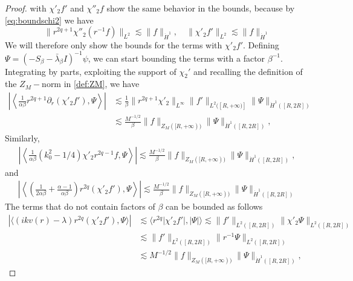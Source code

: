 \documentclass[11pt,reqno]{amsproc}
\def\de{{\partial}}
\def\HH {\dot{H}^1}
\theoremstyle{definition}
\theoremstyle{definition}
\numberwithin{equation}{section}
\begin{document}
\begin{proof}
with $\chi'_2 f'$ and $\chi''_2 f$ show the same behavior in the bounds, because by \cref{eq:boundschi2} we have
\begin{equation}
\|r^{2q+1}\chi''_2  (r^{-1}f)\|_{L^2} \lesssim \|f\|_{\HH}, \quad \|\chi'_2 f'\|_{L^2} \lesssim \|f\|_{\HH} 
\end{equation}
We will therefore only show the bounds for the terms with $\chi'_2 f'$. Defining $\Psi = (-S_\beta-\bar\lambda_\beta I)^{-1} \psi$, we can start bounding the terms with a factor $\beta^{-1}$. Integrating by parts, exploiting the support of $\chi_2'$ and recalling the definition of the $Z_M-$norm in \cref{def:ZM}, we have
\begin{align}
    \left| \left\langle \frac{1}{\alpha \beta} r^{2q+1}\de_r (\chi'_2 f'), \Psi \right\rangle\right| & \lesssim \frac{1}{\beta} \|r^{2q+1}\chi'_2\|_{L^\infty} \|f' \|_{L^2([R,+\infty)]}\|\Psi\|_{\dot{H}^1([R,2R])} \\ & \lesssim \frac{ M^{-1/2}}{\beta}  \|f \|_{Z_M([R,+\infty))} \|\Psi\|_{\HH([R,2R])},\label{eq:boundbeta1}
\end{align}
Similarly,
\begin{align}
\left|\left\langle \frac{1}{\alpha \beta} (k_{0}^2-1/4) \chi'_2 r^{2q-1} f, \Psi \right\rangle\right| 
    \lesssim \frac{M^{-1/2}}{\beta} \|f\|_{Z_M([R,+\infty))} \|\Psi\|_{\HH([R,2R])},\label{eq:boundbeta2}
\end{align}
and 
\begin{align}
    \left| \left\langle \left(\frac{1}{2\alpha \beta} + \frac{\alpha -1}{\alpha\beta}\right) r^{2q}(\chi'_2 f'), \Psi \right\rangle\right| \lesssim \frac{M^{-1/2}}{\beta} \|f\|_{Z_M([R,+\infty))} \|\Psi\|_{\HH([R,2R])}
\label{eq:boundbeta3}
\end{align}
The terms that do not contain factors of $\beta$ can be bounded as follows
\begin{align}
|\langle (ikv(r) - \lambda) r^{2q}(\chi'_2 f'), \Psi\rangle| & \lesssim \langle r^{2q}|\chi'_2 f'|, |\Psi| \rangle   \lesssim \|f'\|_{L^2([R,2R])} \|\chi'_2 \Psi\|_{L^2([R,2R])} \\ & \lesssim \|f'\|_{L^2([R,2R])} \|r^{-1} \Psi\|_{L^2([R,2R])}  \\ & \lesssim M^{-1/2} \|f\|_{Z_M([R,+\infty))} \|\Psi\|_{\HH([R,2R])},

\end{align}
\end{proof}
\end{document}
